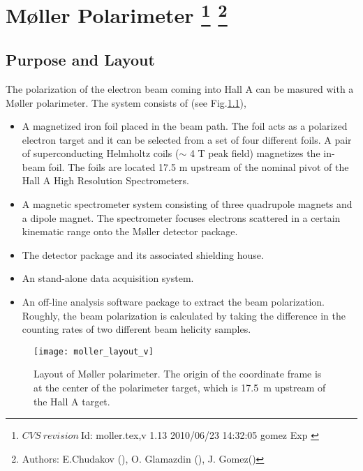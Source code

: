 \chapter[M{\o}ller Polarimeter]{M{\o}ller Polarimeter
\label{sec:moller}
\footnote{
  $CVS~revision~ $Id: moller.tex,v 1.13 2010/06/23 14:32:05 gomez Exp $ $
}
\footnote{Authors: E.Chudakov (), O. Glamazdin (), J. Gomez\hfill\break ()}
}
\section {Purpose and Layout}
\label{sec:moller_purpose}


The polarization of the electron beam coming into Hall A can be masured 
with a M{\o}ller 
polarimeter. 
The system consists of (see Fig.\ref{fig:moller_layout}),
\vspace{-\parskip}
\begin{itemize}
\item  A magnetized iron foil placed in the beam path. The foil acts as a polarized electron target and it can be selected
from a set of four different foils.
A pair of superconducting Helmholtz coils
($\sim$ 4 T peak field) magnetizes the in-beam foil. The foils are located 17.5 m upstream of the nominal pivot of the 
Hall A High Resolution Spectrometers.
\item A magnetic spectrometer system consisting of three quadrupole magnets and a dipole magnet.
The spectrometer focuses electrons scattered in a certain kinematic range
onto the M{\o}ller detector package. 
\item The detector package and its associated shielding house.
\item An stand-alone data acquisition system.
\item An off-line analysis software package to extract the beam polarization. Roughly, the beam polarization is calculated
by taking the difference in the counting rates of two different beam helicity samples.
\end{itemize}

 \begin{figure}[bht]
    \begin{center}
        \texttt{[image: moller\_layout\_v]}
    \end{center}
    \caption[M{\o}ller: layout]{
            Layout of M{\o}ller polarimeter. The origin of the 
            coordinate frame is at the center of the polarimeter
             target, which is 17.5~m upstream of the Hall A target.
            }
    \label{fig:moller_layout} 
 \end{figure}  


